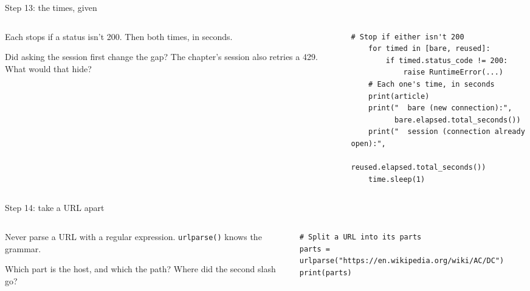 \documentclass[9pt,aspectratio=169]{beamer}
\begin{document}
\begin{frame}[fragile]{Step 13: the times, given}
    \begin{columns}[T]
        \begin{column}{0.37\textwidth}
            Each stops if a status isn't 200. Then both times, in seconds.

            \medskip
            Did asking the session first change the gap? The chapter's session also retries a 429. What would that hide?
        \end{column}
        \begin{column}{0.6\textwidth}
\begin{lstlisting}[style=lab]
    # Stop if either isn't 200
    for timed in [bare, reused]:
        if timed.status_code != 200:
            raise RuntimeError(...)
    # Each one's time, in seconds
    print(article)
    print("  bare (new connection):",
          bare.elapsed.total_seconds())
    print("  session (connection already open):",
          reused.elapsed.total_seconds())
    time.sleep(1)
\end{lstlisting}
        \end{column}
    \end{columns}
\end{frame}

\begin{frame}[fragile]{Step 14: take a URL apart}
    \begin{columns}[T]
        \begin{column}{0.37\textwidth}
            Never parse a URL with a regular expression. \texttt{urlparse()} knows the grammar.

            \medskip
            Which part is the host, and which the path? Where did the second slash go?
        \end{column}
        \begin{column}{0.6\textwidth}
\begin{lstlisting}[style=lab]
# Split a URL into its parts
parts = urlparse("https://en.wikipedia.org/wiki/AC/DC")
print(parts)
\end{lstlisting}
        \end{column}
    \end{columns}
\end{frame}
\end{document}
